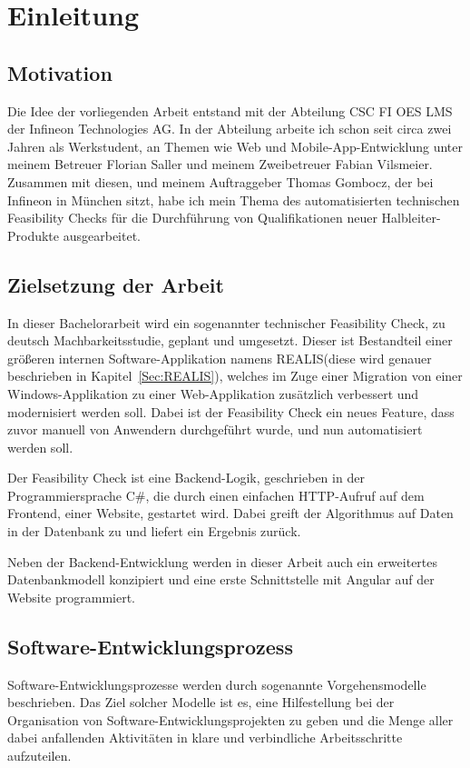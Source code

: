 \chapter{Einleitung}

\section{Motivation}
Die Idee der vorliegenden Arbeit entstand mit der Abteilung CSC FI OES LMS der Infineon Technologies AG. 
In der Abteilung arbeite ich schon seit circa zwei Jahren als Werkstudent, an Themen wie Web und Mobile-App-Entwicklung unter meinem Betreuer Florian Saller und meinem Zweibetreuer Fabian Vilsmeier.
Zusammen mit diesen, und meinem Auftraggeber Thomas Gombocz, der bei Infineon in München sitzt, habe ich mein Thema des automatisierten technischen Feasibility Checks für die Durchführung von Qualifikationen neuer Halbleiter-Produkte ausgearbeitet.


\section{Zielsetzung der Arbeit}
In dieser Bachelorarbeit wird ein sogenannter technischer Feasibility Check, zu deutsch Machbarkeitsstudie, geplant und umgesetzt. Dieser ist Bestandteil einer größeren internen Software-Applikation namens \ac{REALIS}(diese wird genauer beschrieben in Kapitel~\ref{Sec:REALIS}), welches
im Zuge einer Migration  von einer Windows-Applikation zu einer Web-Applikation zusätzlich verbessert und modernisiert werden soll. Dabei ist der Feasibility Check ein neues Feature, dass zuvor manuell von Anwendern durchgeführt wurde, und nun automatisiert werden soll.

Der Feasibility Check ist eine Backend-Logik, geschrieben in der Programmiersprache C\#, die durch einen einfachen HTTP-Aufruf auf dem Frontend, einer Website, gestartet wird. Dabei greift der Algorithmus auf Daten in der Datenbank zu und liefert ein Ergebnis zurück.

Neben der Backend-Entwicklung werden in dieser Arbeit auch ein erweitertes Datenbankmodell konzipiert und eine erste Schnittstelle mit Angular auf der Website programmiert. 

\section{Software-Entwicklungsprozess}
Software-Entwicklungsprozesse werden durch sogenannte Vorgehensmodelle beschrieben. Das Ziel solcher Modelle ist es, eine Hilfestellung bei der Organisation von Software-Entwicklungsprojekten zu geben und die Menge aller dabei anfallenden Aktivitäten in klare und verbindliche Arbeitsschritte aufzuteilen. 

